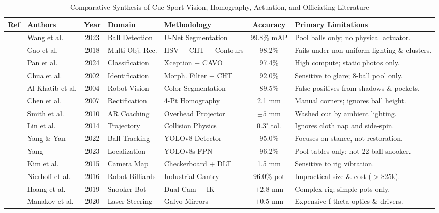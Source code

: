 \documentclass[conference]{IEEEtran}
\begin{document}
\begin{table}[t]
\centering
\caption{Comparative Synthesis of Cue-Sport Vision, Homography, Actuation, and Officiating Literature}
\label{tab:survey_matrix}
\scriptsize
\begin{tabular}{|c|l|c|l|l|c|p{4.8cm}|}
\hline
\textbf{Ref} & \textbf{Authors} & \textbf{Year} & \textbf{Domain} & \textbf{Methodology} & \textbf{Accuracy} & \textbf{Primary Limitations} \\
\hline
\cite{ref1} & Wang et al. & 2023 & Ball Detection & U-Net Segmentation & 99.8\% mAP & Pool balls only; no physical actuator. \\
\cite{ref2} & Gao et al. & 2018 & Multi-Obj. Rec. & HSV + CHT + Contours & 98.2\% & Fails under non-uniform lighting \& clusters. \\
\cite{ref3} & Pan et al. & 2024 & Classification & Xception + CAVO & 97.4\% & High compute; static photos only. \\
\cite{ref4} & Chua et al. & 2002 & Identification & Morph. Filter + CHT & 92.0\% & Sensitive to glare; 8-ball pool only. \\
\cite{ref5} & Al-Khatib et al. & 2004 & Robot Vision & Color Segmentation & 89.5\% & False positives from shadows \& pockets. \\
\cite{ref7} & Chen et al. & 2007 & Rectification & 4-Pt Homography & 2.1 mm & Manual corners; ignores ball height. \\
\cite{ref8} & Smith et al. & 2010 & AR Coaching & Overhead Projector & $\pm 5$ mm & Washed out by ambient lighting. \\
\cite{ref10} & Lin et al. & 2014 & Trajectory & Collision Physics & $0.3^\circ$ tol. & Ignores cloth nap and side-spin. \\
\cite{ref11} & Yang \& Yan & 2022 & Ball Tracking & YOLOv8 Detector & 95.0\% & Focuses on stance, not restoration. \\
\cite{ref12} & Yang & 2023 & Localization & YOLOv8s FPN & 96.2\% & Pool tables only; not 22-ball snooker. \\
\cite{ref13} & Kim et al. & 2015 & Camera Map & Checkerboard + DLT & 1.5 mm & Sensitive to rig vibration. \\
\cite{ref15} & Nierhoff et al. & 2016 & Robot Billiards & Industrial Gantry & 96.0\% pot & Impractical size \& cost ($>\$25\text{k}$). \\
\cite{ref16} & Hoang et al. & 2019 & Snooker Bot & Dual Cam + IK & $\pm 2.8$ mm & Complex rig; simple pots only. \\
\cite{ref17} & Manakov et al. & 2020 & Laser Steering & Galvo Mirrors & $\pm 0.5$ mm & Expensive f-theta optics \& drivers. \\

\end{tabular}
\end{table}
\end{document}
